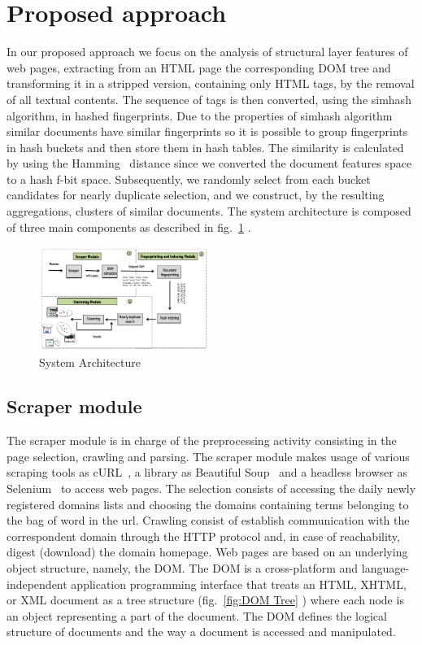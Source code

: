 \documentclass{easychair}
\begin{document}
\section{Proposed approach}
\label{sect:Proposed approach}

In our proposed approach we focus on the analysis of structural layer features of web pages, extracting from an HTML page the corresponding DOM tree and transforming it in a stripped version, containing only HTML tags, by the removal of all textual contents. 
The sequence of tags is then converted, using the simhash algorithm, in hashed fingerprints. Due to the properties of simhash algorithm similar documents have similar fingerprints so it is possible to group fingerprints in hash buckets and then store them in hash tables. 
The similarity is calculated by using the Hamming~\cite{6772729} distance since we converted the document features space to a hash f-bit space. Subsequently, we randomly select from each bucket candidates for nearly duplicate selection, and we construct, by the resulting aggregations, clusters of similar documents. The system architecture is composed of three main components as described in fig.~\ref{fig:1} .

\begin{figure}[ht]
  \begin{centering}
  \includegraphics[width=0.5\textwidth]{1.png}
  \caption{System Architecture}
  \label{fig:1}
  \end{centering}
\end{figure}

\subsection{Scraper module}
\label{sect:Scraper module}

The scraper module is in charge of the preprocessing activity consisting in the page selection, crawling and parsing. The scraper module makes usage of various scraping tools as cURL~\cite{curl}, a library as Beautiful Soup~\cite{bs4} and a headless browser as Selenium~\cite{selenium} to access web pages. The selection consists of accessing the daily newly registered domains lists and choosing the domains containing terms belonging to the bag of word in the url. Crawling consist of establish communication with the correspondent domain through the HTTP protocol and, in case of reachability, digest (download) the domain homepage. Web pages are based on an underlying object structure, namely, the DOM. The DOM is a cross-platform and language-independent application programming interface that treats an HTML, XHTML, or XML document as a tree structure (fig.~\ref{fig:DOM Tree} ) where each node is an object representing a part of the document. The DOM defines the logical structure of documents and the way a document is accessed and manipulated.
\end{document}

